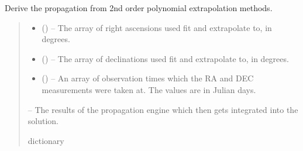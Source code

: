 \documentclass[letterpaper,11pt,english]{sphinxmanual}
\begin{document}

\begin{savenotes}\begin{fulllineitems}
\label{\detokenize{code/opihiexarata.propagate.solution:opihiexarata.propagate.solution._vehicle_quadratic_propagation}}
\pysigstartsignatures
{}
\pysigstopsignatures
\sphinxAtStartPar
Derive the propagation from 2nd order polynomial extrapolation methods.
\begin{quote}\begin{description}
\begin{itemize}
\item {} 
\sphinxAtStartPar
{} () – The array of right ascensions used fit and extrapolate to,
in degrees.

\item {} 
\sphinxAtStartPar
{} () – The array of declinations used fit and extrapolate to, in degrees.

\item {} 
\sphinxAtStartPar
{} () – An array of observation times which the RA and DEC measurements
were taken at. The values are in Julian days.

\end{itemize}

\sphinxAtStartPar
{} – The results of the propagation engine which then gets integrated into
the solution.

\sphinxAtStartPar
dictionary

\end{description}\end{quote}

\end{fulllineitems}\end{savenotes}
\end{document}
